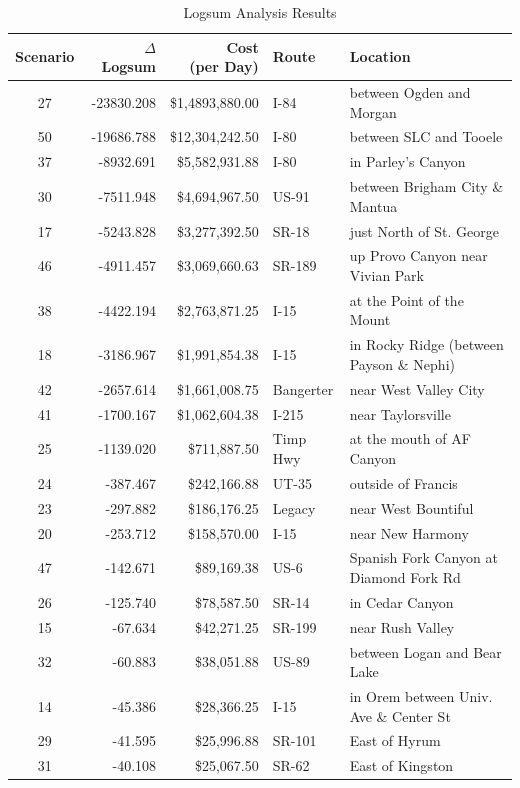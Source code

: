 \begin{table}
\caption{\label{tab:linkresults}Logsum Analysis Results}
\centering
\begin{tabular}[t]{crrll}
\toprule
Scenario & $\Delta$ Logsum & \makecell{Cost \\(per Day)} & Route & Location\\
\midrule
27 & -23830.208 & \$1,4893,880.00 & I-84 & between Ogden and Morgan\\
50 & -19686.788 & \$12,304,242.50 & I-80 & between SLC and Tooele\\
37 & -8932.691 & \$5,582,931.88 & I-80 & in Parley's Canyon\\
30 & -7511.948 & \$4,694,967.50 & US-91 & between Brigham City \& Mantua\\
17 & -5243.828 & \$3,277,392.50 & SR-18 & just North of St. George\\
46 & -4911.457 & \$3,069,660.63 & SR-189 & up Provo Canyon near Vivian Park\\
38 & -4422.194 & \$2,763,871.25 & I-15 & at the Point of the Mount\\
18 & -3186.967 & \$1,991,854.38 & I-15 & in Rocky Ridge (between Payson \& Nephi)\\
42 & -2657.614 & \$1,661,008.75 & Bangerter & near West Valley City\\
41 & -1700.167 & \$1,062,604.38 & I-215 & near Taylorsville\\
25 & -1139.020 & \$711,887.50 & Timp Hwy & at the mouth of AF Canyon\\
24 & -387.467 & \$242,166.88 & UT-35 & outside of Francis\\
23 & -297.882 & \$186,176.25 & Legacy & near West Bountiful\\
20 & -253.712 & \$158,570.00 & I-15 & near New Harmony\\
47 & -142.671 & \$89,169.38 & US-6 & Spanish Fork Canyon at Diamond Fork Rd\\
26 & -125.740 & \$78,587.50 & SR-14 & in Cedar Canyon\\
15 & -67.634 & \$42,271.25 & SR-199 & near Rush Valley\\
32 & -60.883 & \$38,051.88 & US-89 & between Logan and Bear Lake\\
14 & -45.386 & \$28,366.25 & I-15 & in Orem between Univ. Ave \& Center St\\
29 & -41.595 & \$25,996.88 & SR-101 & East of Hyrum\\
31 & -40.108 & \$25,067.50 & SR-62 & East of Kingston\\

\end{tabular}
\end{table}
